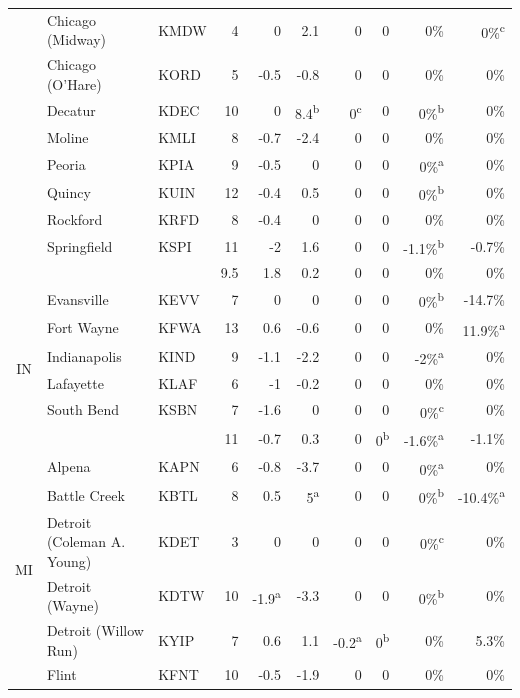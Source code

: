 \documentclass[twocol]{ametsoc}
\begin{document}
\begin{landscape}
\begin{table}[]
\begin{tabular}{@{}cllrrrrrrr@{}}
 & Chicago (Midway) & KMDW & 4 & 0 & 2.1 & 0 & 0 & 0\% & 0\%\textsuperscript{c} \\
 & Chicago (O'Hare) & KORD & 5 & -0.5 & -0.8 & 0 & 0 & 0\% & 0\% \\
 & Decatur & KDEC & 10 & 0 & 8.4\textsuperscript{b} & 0\textsuperscript{c} & 0 & 0\%\textsuperscript{b} & 0\% \\
 & Moline & KMLI & 8 & -0.7 & -2.4 & 0 & 0 & 0\% & 0\% \\
 & Peoria & KPIA & 9 & -0.5 & 0 & 0 & 0 & 0\%\textsuperscript{a} & 0\% \\
 & Quincy & KUIN & 12 & -0.4 & 0.5 & 0 & 0 & 0\%\textsuperscript{b} & 0\% \\
 & Rockford & KRFD & 8 & -0.4 & 0 & 0 & 0 & 0\% & 0\% \\
 & Springfield & KSPI & 11 & -2 & 1.6 & 0 & 0 & -1.1\%\textsuperscript{b} & -0.7\% \\ \cmidrule(l){2-10} 
 &  &  & 9.5 & 1.8 & 0.2 & 0 & 0 & 0\% & 0\% \\ \midrule
\multirow{6}{*}{IN} & Evansville & KEVV & 7 & 0 & 0 & 0 & 0 & 0\%\textsuperscript{b} & -14.7\% \\
 & Fort Wayne & KFWA & 13 & 0.6 & -0.6 & 0 & 0 & 0\% & 11.9\%\textsuperscript{a} \\
 & Indianapolis & KIND & 9 & -1.1 & -2.2 & 0 & 0 & -2\%\textsuperscript{a} & 0\% \\
 & Lafayette & KLAF & 6 & -1 & -0.2 & 0 & 0 & 0\% & 0\% \\
 & South Bend & KSBN & 7 & -1.6 & 0 & 0 & 0 & 0\%\textsuperscript{c} & 0\% \\ \cmidrule(l){2-10} 
 &  &  & 11 & -0.7 & 0.3 & 0 & 0\textsuperscript{b} & -1.6\%\textsuperscript{a} & -1.1\% \\ \midrule
\multirow{18}{*}{MI} & Alpena & KAPN & 6 & -0.8 & -3.7 & 0 & 0 & 0\%\textsuperscript{a} & 0\% \\
 & Battle Creek & KBTL & 8 & 0.5 & 5\textsuperscript{a} & 0 & 0 & 0\%\textsuperscript{b} & -10.4\%\textsuperscript{a} \\
 & Detroit (Coleman A. Young) & KDET & 3 & 0 & 0 & 0 & 0 & 0\%\textsuperscript{c} & 0\% \\
 & Detroit (Wayne) & KDTW & 10 & -1.9\textsuperscript{a} & -3.3 & 0 & 0 & 0\%\textsuperscript{b} & 0\% \\
 & Detroit (Willow Run) & KYIP & 7 & 0.6 & 1.1 & -0.2\textsuperscript{a} & 0\textsuperscript{b} & 0\% & 5.3\% \\
 & Flint & KFNT & 10 & -0.5 & -1.9 & 0 & 0 & 0\% & 0\% \\

\end{tabular}
\end{table}
\end{landscape}
\end{document}
